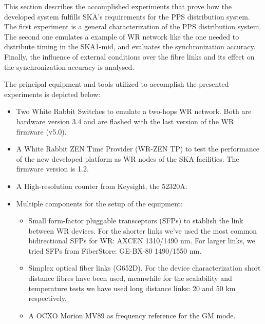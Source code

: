 
This section describes the accomplished experiments that prove how the 
developed system fulfills SKA's requirements for the PPS distribution system. 
 The first experiment is a general 
characterization of the PPS distribution system. The second one emulates a 
example of WR network like the one needed to distribute timing in the SKA1-mid, 
and evaluates the synchronization accuracy. Finally, the influence of external 
conditions over the fibre links and its effect on the synchronization accuracy 
is analysed.

The principal equipment and tools utilized to accomplish the presented 
experiments is depicted below:

\begin{itemize}
    \item Two White Rabbit Switches to emulate a two-hops WR network. Both are 
    hardware version 3.4 and are flashed with the last version of the WR 
    firmware (v5.0).
    
    \item A White Rabbit ZEN Time Provider (WR-ZEN TP) to test the performance 
    of the new developed platform as WR nodes of the SKA facilities. The 
    firmware version is 1.2.
    
    \item A High-resolution counter from Keysight, the 52320A.
    
    \item Multiple components for the setup of the equipment:
    \begin{itemize}
        \item Small form-factor pluggable transceptors (SFPs) to stablish the 
        link between WR devices. For the shorter links we've used the most 
        common bidirectional SFPs for WR: AXCEN 1310/1490 nm. For larger links, 
        we tried 
        SFPs from FiberStore: GE-BX-80 1490/1550 nm.
        \item Simplex optical fiber links (G652D). For the device 
        characterization short distance fibres have been used, meanwhile for 
        the scalability and temperature tests we have used long distance links: 
        20 and 50 km respectively.
        \item A OCXO Morion MV89 as frequency reference for the GM mode.
    \end{itemize}
    
\end{itemize}

